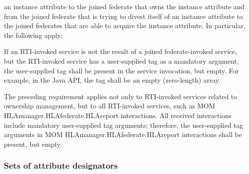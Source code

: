 \begin{compactstdpage}

    an instance attribute to the joined federate that owns the instance attribute and from the joined federate that is trying to divest itself of an instance attribute to the joined federates that are able to acquire the instance attribute. In particular, the following apply:




    If an RTI-invoked service is not the result of a joined federate-invoked service, but the RTI-invoked service has a user-supplied tag as a mandatory argument, the user-supplied tag shall be present in the service invocation, but empty. For example, in the Java API, the tag shall be an empty (zero-length) array.


    The preceding requirement applies not only to RTI-invoked services related to ownership management, but to all RTI-invoked services, such as MOM HLAmanager.HLAfederate.HLAreport interactions. All received interactions include mandatory user-supplied tag arguments; therefore, the user-supplied tag arguments in MOM HLAmanager.HLAfederate.HLAreport interactions shall be present, but empty.

    \subsubsection{Sets of attribute designators}



\end{compactstdpage}

